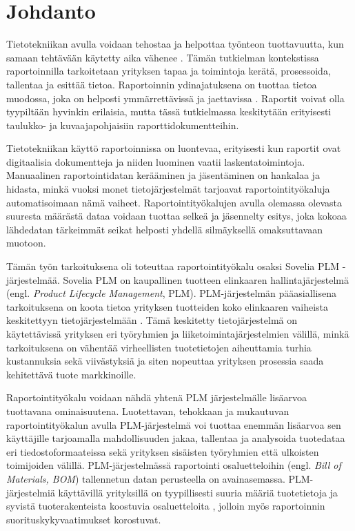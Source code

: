 \chapter{Johdanto} \label{Johdanto}

Tietotekniikan avulla voidaan tehostaa ja helpottaa työnteon tuottavuutta, kun samaan tehtävään käytetty aika vähenee \cite{rakovic_digital_2022}. Tämän tutkielman kontekstissa raportoinnilla tarkoitetaan yrityksen tapaa ja toimintoja kerätä, prosessoida, tallentaa ja esittää tietoa. Raportoinnin ydinajatuksena on tuottaa tietoa muodossa, joka on helposti ymmärrettävissä ja jaettavissa \cite{glockner_reports_2022}. Raportit voivat olla tyypiltään hyvinkin erilaisia, mutta tässä tutkielmassa keskitytään erityisesti taulukko- ja kuvaajapohjaisiin raporttidokumentteihin.
 
Tietotekniikan käyttö raportoinnissa on luontevaa, erityisesti kun raportit ovat digitaalisia dokumentteja ja niiden luominen vaatii laskentatoimintoja. Manuaalinen raportointidatan kerääminen ja jäsentäminen on hankalaa ja hidasta, minkä vuoksi monet tietojärjestelmät tarjoavat raportointityökaluja automatisoimaan nämä vaiheet. Raportointityökalujen avulla olemassa olevasta suuresta määrästä dataa voidaan tuottaa selkeä ja jäsennelty esitys, joka kokoaa lähdedatan tärkeimmät seikat helposti yhdellä silmäyksellä omaksuttavaan muotoon.\cite{adhi_performance_2019}

Tämän työn tarkoituksena oli toteuttaa raportointityökalu osaksi Sovelia PLM -järjestelmää. Sovelia PLM on kaupallinen tuotteen elinkaaren hallintajärjestelmä  (engl. \textit{Product Lifecycle Management}, PLM)\cite{soveliaAboutSovelia}. PLM-järjestelmän pääasiallisena tarkoituksena on koota tietoa yrityksen tuotteiden koko elinkaaren vaiheista keskitettyyn tietojärjestelmään \cite{alemanni_key_2008}. Tämä keskitetty tietojärjestelmä on käytettävissä yrityksen eri työryhmien ja liiketoimintajärjestelmien välillä, minkä tarkoituksena on vähentää virheellisten tuotetietojen aiheuttamia turhia kustannuksia sekä viivästyksiä ja siten nopeuttaa yrityksen prosessia saada kehitettävä tuote markkinoille. \cite{alemanni_key_2008}

Raportointityökalu voidaan nähdä yhtenä PLM järjestelmälle lisäarvoa tuottavana ominaisuutena.\cite{german_challenge_2016} Luotettavan, tehokkaan ja mukautuvan raportointityökalun avulla PLM-järjestelmä voi tuottaa enemmän lisäarvoa sen käyttäjille tarjoamalla mahdollisuuden jakaa, tallentaa ja analysoida tuotedataa eri tiedostoformaateissa sekä yrityksen sisäisten työryhmien että ulkoisten toimijoiden välillä.\cite{german_challenge_2016} PLM-järjestelmässä raportointi osaluetteloihin (engl. \textit{Bill of Materials, BOM}) tallennetun datan perusteella on avainasemassa.\cite{german_challenge_2016} PLM-järjestelmiä käyttävillä yrityksillä on tyypillisesti suuria määriä tuotetietoja ja syvistä tuoterakenteista koostuvia osaluetteloita \cite{rohleder_requirements_2014}, jolloin myös raportoinnin suorituskykyvaatimukset korostuvat.

